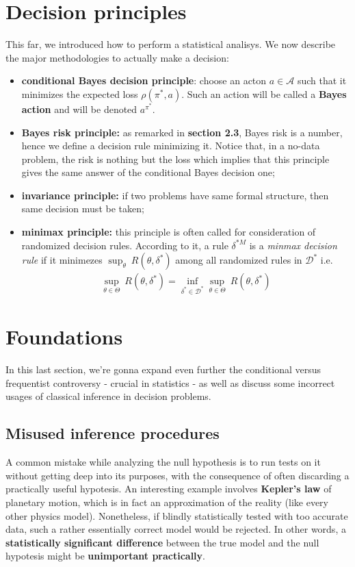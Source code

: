 \documentclass{article}
\begin{document}
	\section{Decision principles}
	This far, we introduced how to perform a statistical analisys. We now describe the major methodologies to actually make a decision: 
	
	\begin{itemize}
		\item \textbf{conditional Bayes decision principle}: choose an acton $a \in \mathcal{A}$ such that it minimizes the expected loss $\rho(\pi^*, a)$. Such an action will be called a 
		\textbf{Bayes action} and will be denoted $a^{\pi^*}$. 
	     
		\item \textbf{Bayes risk principle:} as remarked in \textbf{section 2.3}, Bayes risk is a number, hence we define a decision rule minimizing it. Notice that, in a no-data problem, the risk is nothing but the loss which implies that this principle gives the same answer of the conditional Bayes decision one;
		\item \textbf{invariance principle:} if two problems have same formal structure, then same decision must be taken;
		\item\textbf{minimax principle:} this principle is often called for consideration of randomized decision rules. According to it, a rule $\delta^{*M}$ is a \textit{minmax decision rule} if it minimezes $\sup_{\theta} \ R(\theta, \delta^*)$ among all randomized rules in $\mathcal{D}^*$ i.e.
		\begin{align*}
			\sup_{\theta \in \Theta} \ R(\theta, \delta^*) = \inf_{\delta^* \in \mathcal{D}^*} \sup_{\theta \in \Theta} \ R(\theta, \delta^*)
		\end{align*}
	\end{itemize}
	
	\section{Foundations}
	In this last section, we're gonna expand even further the conditional versus frequentist controversy - crucial in statistics - as well as discuss some incorrect usages of classical inference in decision problems.
	
	\subsection{Misused inference procedures}	
	A common mistake while analyzing the null hypothesis is to run tests on it without getting deep into its purposes, with the consequence of often discarding a practically useful hypotesis. An interesting example
	involves \textbf{Kepler's law} of planetary motion, which is in fact an approximation of the reality (like every other physics model). Nonetheless, if blindly statistically tested with too accurate data, such a rather essentially correct model would be rejected. In other words, a \textbf{statistically significant difference} between the true model and the null hypotesis might be \textbf{unimportant practically}.  
\end{document}
